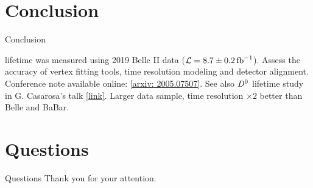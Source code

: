 \section{Conclusion}
\begin{frame}{Conclusion}
\bi
\item \Bz lifetime was measured using 2019 Belle II data ({\small$\mathcal{L}=8.7\pm0.2\mbox{\,fb}^{-1}$}).
\bi
{}
\itemi Assess the accuracy of vertex fitting tools, time resolution modeling and detector alignment.
\itemi Conference note available online: {\small\href{https://arxiv.org/abs/2005.07507}{\color{blue!40!gray}[arxiv: 2005.07507]}}.
\ei
\itemi See also $D^0$ lifetime study in G. Casarosa's talk {\small\href{https://indico.cern.ch/event/868940/contributions/3815673/}{\color{blue!40!gray}[link]}}.
\bi
\itemii Larger data sample, time resolution $\times 2$ better than Belle and BaBar.
\ei
\ei
\end{frame}
\section*{Questions}
\begin{frame}{Questions}
\centering
\Large Thank you for your attention.
\end{frame}
